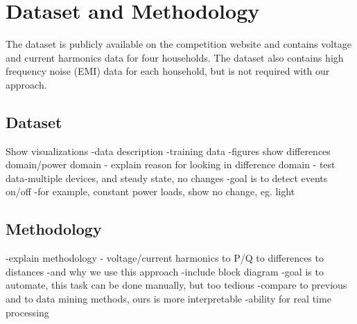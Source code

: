 \documentclass[conference]{IEEEtran}
\begin{document}
\section{Dataset and Methodology}
The dataset is publicly available on the competition website and contains voltage and current harmonics data for four households.  The dataset also contains high frequency noise (EMI) data for each household, but is not required with our approach.  
\subsection{Dataset}
Show visualizations
-data description
-training data
-figures show differences domain/power domain
	- explain reason for looking in difference domain
	- test data-multiple devices, and steady state, no changes
	-goal is to detect events on/off
	-for example, constant power loads, show no change, eg. light
	
\subsection{Methodology}

-explain methodology
	- voltage/current harmonics to P/Q to differences to distances
	-and why we use this approach
	-include block diagram
	-goal is to automate, this task can be done manually, but too tedious
	-compare to previous and to data mining methods, ours is more interpretable
	-ability for real time processing

	
\end{document}

